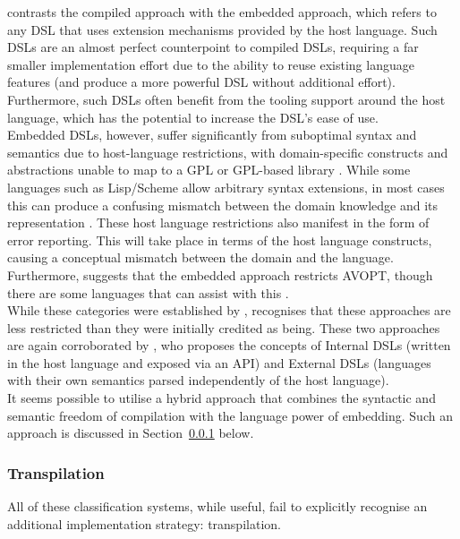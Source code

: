 \documentclass[a4paper,11pt]{report}
\begin{document}
\citet{Mernik:2005:DDL:1118890.1118892} contrasts the compiled approach with the embedded approach, which refers to any DSL that uses extension mechanisms provided by the host language. 
Such DSLs are an almost perfect counterpoint to compiled DSLs, requiring a far smaller implementation effort due to the ability to reuse existing language features (and produce a more powerful DSL without additional effort). 
Furthermore, such DSLs often benefit from the tooling support around the host language, which has the potential to increase the DSL's ease of use. \\

Embedded DSLs, however, suffer significantly from suboptimal syntax and semantics due to host-language restrictions, with domain-specific constructs and abstractions unable to map to a GPL or GPL-based library \citep{Mernik:2005:DDL:1118890.1118892,van2000domain}. 
While some languages such as Lisp/Scheme allow arbitrary syntax extensions, in most cases this can produce a confusing mismatch between the domain knowledge and its representation \citep{jennings1999verischemelog}. 
These host language restrictions also manifest in the form of error reporting. 
This will take place in terms of the host language constructs, causing a conceptual mismatch between the domain and the language. 
Furthermore, \citet{Mernik:2005:DDL:1118890.1118892} suggests that the embedded approach restricts AVOPT, though there are some languages that can assist with this \citep{seefried2004optimising}.\\

While these categories were established by \citet{van2000domain}, \citet{Mernik:2005:DDL:1118890.1118892} recognises that these approaches are less restricted than they were initially credited as being. 
These two approaches are again corroborated by \citet{fowler2010domain}, who proposes the concepts of Internal DSLs (written in the host language and exposed via an API) and External DSLs (languages with their own semantics parsed independently of the host language). \\

It seems possible to utilise a hybrid approach that combines the syntactic and semantic freedom of compilation with the language power of embedding. 
Such an approach is discussed in Section~\ref{ssub:transpilation} below. 


\subsubsection{Transpilation} %
\label{ssub:transpilation}
All of these classification systems, while useful, fail to explicitly recognise an additional implementation strategy: transpilation. \\
\end{document}
